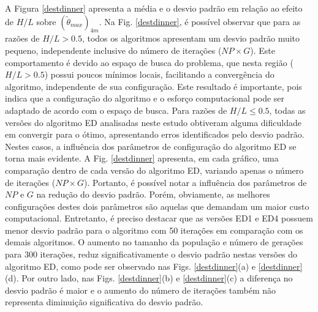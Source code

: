 \documentclass[12pt,A4,A4pt]{article}
\begin{document}
A Figura \ref{destdinner} apresenta a média e o desvio padrão em relação ao efeito de $H/L$ sobre $({\tilde{\theta}}_{max})_{4m}$. Na Fig. \ref{destdinner}, é possível observar que para as razões de $H/L>0.5$, todos os algoritmos apresentam um desvio padrão muito pequeno, independente inclusive do número de iterações ($NP \times G$). Este comportamento é devido ao espaço de busca do problema, que nesta região ($H/L>0.5$) possui poucos mínimos locais, facilitando a convergência do algoritmo, independente de sua configuração. Este resultado é importante, pois indica que a configuração do algoritmo e o esforço computacional pode ser adaptado de acordo com o espaço de busca. 
Para razões de $H/L\leqslant0.5$, todas as versões do algoritmo ED analisadas neste estudo obtiveram alguma dificuldade em convergir para o ótimo, apresentando erros identificados pelo desvio padrão. Nestes casos, a influência dos parâmetros de configuração do algoritmo ED se torna mais evidente. A Fig. \ref{destdinner} apresenta, em cada gráfico, uma comparação dentro de cada versão do algoritmo ED, variando apenas o número de iterações ($NP \times G$). Portanto, é possível notar a influência dos parâmetros de $NP$ e $G$ na redução do desvio padrão. Porém, obviamente, as melhores configurações destes dois parâmetros são aquelas que demandam um maior custo computacional. Entretanto, é preciso destacar que as versões ED1 e ED4 possuem menor desvio padrão para o algoritmo com 50 iterações em comparação com os demais algoritmos. O aumento no tamanho da população e número de gerações para 300 iterações, reduz significativamente o desvio padrão nestas versões do algoritmo ED, como pode ser observado nas Figs. \ref{destdinner}(a) e \ref{destdinner}(d). Por outro lado, nas Figs. \ref{destdinner}(b) e \ref{destdinner}(c) a diferença no desvio padrão é maior e o aumento do número de iterações também não representa diminuição significativa do desvio padrão.
\end{document}
